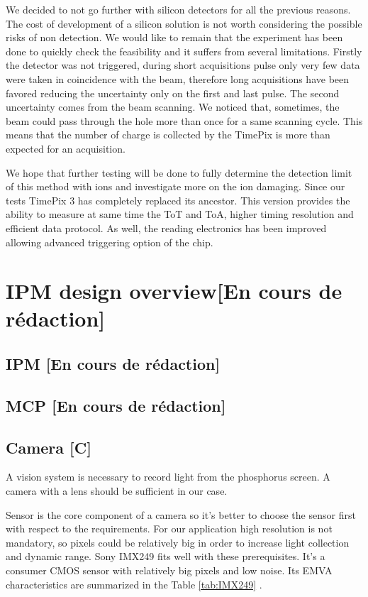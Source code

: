 \begin{refsection}
  We decided to not go further with silicon detectors for all the previous reasons. The cost of development of a silicon solution is not worth considering the possible risks of non detection. We would like to remain that the experiment has been done to quickly check the feasibility and it suffers from several limitations. Firstly the detector was not triggered, during short acquisitions pulse only very few data were taken in coincidence with the beam, therefore long acquisitions have been favored reducing the uncertainty only on the first and last pulse. The second uncertainty comes from the beam scanning. We noticed that, sometimes, the beam could pass through the hole more than once for a same scanning cycle. This means that the number of charge is collected by the TimePix is more than expected for an acquisition.

  We hope that further testing will be done to fully determine the detection limit of this method with ions and investigate more on the ion damaging. Since our tests TimePix 3 has completely replaced its ancestor. This version provides the ability to measure at same time the ToT and ToA, higher timing resolution and efficient data protocol. As well, the reading electronics has been improved allowing advanced triggering option of the chip.
  
  \section{IPM design overview[En cours de rédaction]}
  \subsection{IPM [En cours de rédaction]}
  \subsection{MCP [En cours de rédaction]}
  \subsection{Camera [C]}
  A vision system is necessary to record light from the phosphorus screen.
  A camera with a lens should be sufficient in our case.

  Sensor is the core component of a camera so it's better to choose the sensor first with respect to the requirements.
  For our application high resolution is not mandatory, so pixels could be relatively big in order to increase light collection and dynamic range.
  Sony IMX249 fits well with these prerequisites. It's a consumer CMOS sensor with relatively big pixels and low noise.
  Its EMVA characteristics are summarized in the Table \ref{tab:IMX249} \cite{emva2010}.
  


\end{refsection}
